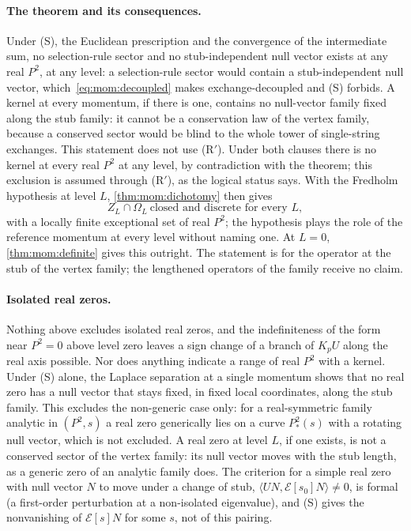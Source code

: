 \paragraph{The theorem and its consequences.}
Under (S), the Euclidean prescription and the convergence of the intermediate sum, no selection-rule sector and no stub-independent null vector exists at any real $P^2$, at any level: a selection-rule sector would contain a stub-independent null vector, which~\eqref{eq:mom:decoupled} makes exchange-decoupled and (S) forbids.
A kernel at every momentum, if there is one, contains no null-vector family fixed along the stub family: it cannot be a conservation law of the vertex family, because a conserved sector would be blind to the whole tower of single-string exchanges.
This statement does not use (R$'$).
Under both clauses there is no kernel at every real $P^2$ at any level, by contradiction with the theorem; this exclusion is assumed through (R$'$), as the logical status says.
With the Fredholm hypothesis at level $L$, \cref{thm:mom:dichotomy} then gives
\begin{equation}
  \label{eq:mom:d1-every-level}
  Z_L \cap \Omega_L \ \text{closed and discrete for every } L,
\end{equation}
with a locally finite exceptional set of real $P^2$; the hypothesis plays the role of the reference momentum at every level without naming one.
At $L = 0$, \cref{thm:mom:definite} gives this outright.
The statement is for the operator at the stub of the vertex family; the lengthened operators of the family receive no claim.

\paragraph{Isolated real zeros.}
Nothing above excludes isolated real zeros, and the indefiniteness of the form near $P^2 = 0$ above level zero leaves a sign change of a branch of $K_p U$ along the real axis possible.
Nor does anything indicate a range of real $P^2$ with a kernel.
Under (S) alone, the Laplace separation at a single momentum shows that no real zero has a null vector that stays fixed, in fixed local coordinates, along the stub family.
This excludes the non-generic case only: for a real-symmetric family analytic in $(P^2, s)$ a real zero generically lies on a curve $P_*^2(s)$ with a rotating null vector, which is not excluded.
A real zero at level $L$, if one exists, is not a conserved sector of the vertex family: its null vector moves with the stub length, as a generic zero of an analytic family does.
The criterion for a simple real zero with null vector $N$ to move under a change of stub, $\langle U N, \mathcal E[s_0] N \rangle \ne 0$, is formal (a first-order perturbation at a non-isolated eigenvalue), and (S) gives the nonvanishing of $\mathcal E[s] N$ for some $s$, not of this pairing.

